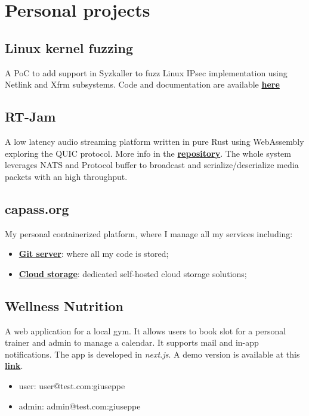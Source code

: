 \documentclass[11pt,a4paper]{article}
\begin{document}
  \section{Personal projects}
  \subsection{Linux kernel fuzzing} A PoC to add support in Syzkaller to fuzz Linux IPsec implementation
  using Netlink and Xfrm subsystems. Code and documentation are available \href{https://github.com/alarmfox/progetto-software-security}{\textbf{here}}

  \subsection{RT-Jam} A low latency audio streaming platform written in pure Rust using WebAssembly exploring 
  the QUIC protocol. More info in the \href{https://github.com/alarmfox/rt-jam}{\textbf{repository}}. The whole system leverages 
  NATS and Protocol buffer to broadcast and serialize/deserialize media packets with an high 
  throughput.
  \subsection{capass.org}
  My personal containerized platform, where I manage all my services including:
  \begin{itemize}
    \item \href{https://git.capass.org}{\textbf{Git server}}: where all my code is stored;
    \item \href{https://cloud.capass.org}{\textbf{Cloud storage}}: dedicated self-hosted cloud storage solutions;
  \end{itemize}

  \subsection{Wellness Nutrition}
  A web application for a local gym. It allows users to book slot for a personal trainer and admin to manage a calendar. It supports mail and in-app notifications. The app is developed in  \textit{next.js}. A demo version is available at this \href{https://wellness-nutrition.vercel.app}{\textbf{link}}.\\
\begin{itemize}
  \item user: user@test.com:giuseppe
  \item admin: admin@test.com:giuseppe
\end{itemize}
\end{document}
